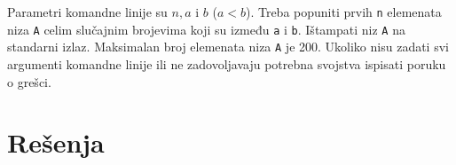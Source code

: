 \fi

\begin{Exercise}[label=v2.2_01] 
Parametri komandne linije su $n, a$ i $b$ ($a < b$). Treba popuniti
prvih {\tt n} elemenata niza {\tt A} celim slu\v cajnim brojevima koji
su između {\tt a} i {\tt b}. I\v stampati niz {\tt A} na standarni
izlaz. Maksimalan broj elemenata niza {\tt A} je 200. Ukoliko nisu
zadati svi argumenti komandne linije ili ne zadovoljavaju potrebna
svojstva ispisati poruku o gre\v sci. 

\end{Exercise}

\ifresenja
\section{Rešenja}
\shipoutAnswer
\fi
